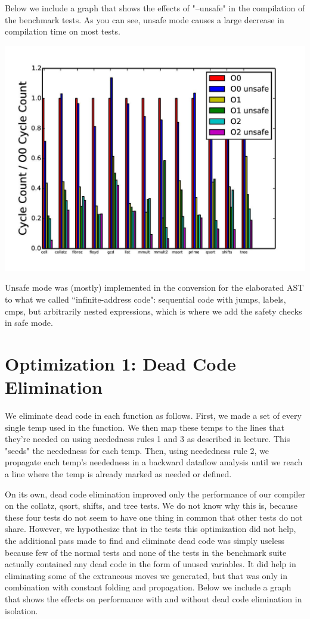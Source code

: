\documentclass{article}
\begin{document}
Below we include a graph that shows the effects of "--unsafe" in the compilation of the benchmark tests. As you can see, unsafe mode causes a large decrease in compilation time on most tests. 

\includegraphics[scale=0.5]{everything-page-001}

Unsafe mode was (mostly) implemented in the conversion for the elaborated AST to what we called ``infinite-address code": sequential code with jumps, labels, cmps, but arbitrarily nested expressions, which is where we add the safety checks in safe mode.

\section{Optimization 1: Dead Code Elimination}

We eliminate dead code in each function as follows. First, we made a set of every single temp used in the function. We then map these temps to the lines that they're needed on using neededness rules 1 and 3 as described in lecture. This "seeds" the neededness for each temp. Then, using neededness rule 2, we propagate each temp's neededness in a backward dataflow analysis until we reach a line where the temp is already marked as needed or defined. 

On its own, dead code elimination improved only the performance of our compiler on the collatz, qsort, shifts, and tree tests. We do not know why this is, because these four tests do not seem to have one thing in common that other tests do not share. However, we hypothesize that in the tests this optimization did not help, the additional pass made to find and eliminate dead code was simply useless because few of the normal tests and none of the tests in the benchmark suite actually contained any dead code in the form of unused variables. It did help in eliminating some of the extraneous moves we generated, but that was only in combination with constant folding and propagation. Below we include a graph that shows the effects on performance with and without dead code elimination in isolation.
\end{document}
